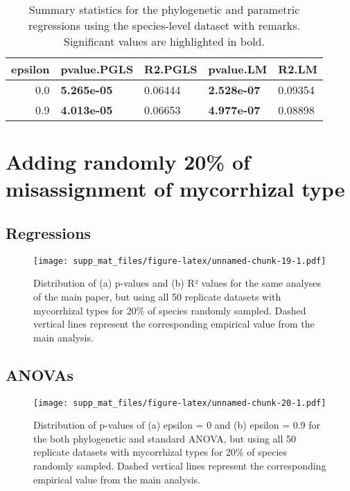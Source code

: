 \documentclass[]{article}
\begin{document}
\begin{table}[H]

\caption{\label{tab:unnamed-chunk-17}Summary statistics for the phylogenetic and parametric regressions using the species-level dataset with remarks. Significant values are highlighted in bold.}
\centering
\begin{tabular}{r|l|l|l|l}
\hline
epsilon & pvalue.PGLS & R2.PGLS & pvalue.LM & R2.LM\\
\hline
0.0 & \textbf{5.265e-05} & 0.06444 & \textbf{2.528e-07} & 0.09354\\
\hline
0.9 & \textbf{4.013e-05} & 0.06653 & \textbf{4.977e-07} & 0.08898\\
\hline
\end{tabular}
\end{table}

\hypertarget{adding-randomly-20-of-misassignment-of-mycorrhizal-type}{%
\section{Adding randomly 20\% of misassignment of mycorrhizal
type}\label{adding-randomly-20-of-misassignment-of-mycorrhizal-type}}

\hypertarget{regressions}{%
\subsection{Regressions}\label{regressions}}

\begin{figure}
\centering
\texttt{[image: supp\_mat\_files/figure-latex/unnamed-chunk-19-1.pdf]}
\caption{Distribution of (a) p-values and (b) R² values for the same
analyses of the main paper, but using all 50 replicate datasets with
mycorrhizal types for 20\% of species randomly sampled. Dashed vertical
lines represent the corresponding empirical value from the main
analysis.}
\end{figure}

\hypertarget{anovas}{%
\subsection{ANOVAs}\label{anovas}}

\begin{figure}
\centering
\texttt{[image: supp\_mat\_files/figure-latex/unnamed-chunk-20-1.pdf]}
\caption{Distribution of p-values of (a) epsilon = 0 and (b) epsilon =
0.9 for the both phylogenetic and standard ANOVA, but using all 50
replicate datasets with mycorrhizal types for 20\% of species randomly
sampled. Dashed vertical lines represent the corresponding empirical
value from the main analysis.}
\end{figure}
\end{document}
